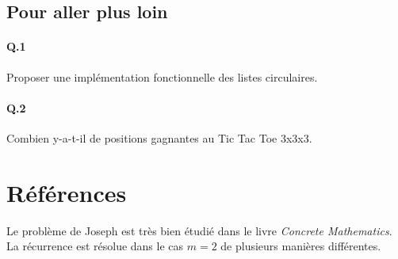 \documentclass[10pt,a4paper]{article}
\begin{document}
\subsection{Pour aller plus loin}
\paragraph{Q.1}Proposer une implémentation fonctionnelle des listes circulaires.
\paragraph{Q.2}Combien y-a-t-il de positions gagnantes au Tic Tac Toe
3x3x3. 
\section{Références}
Le problème de Joseph est très bien étudié dans le livre \emph{Concrete Mathematics}. La récurrence est résolue dans le cas $m=2$ de plusieurs manières différentes.
\end{document}
